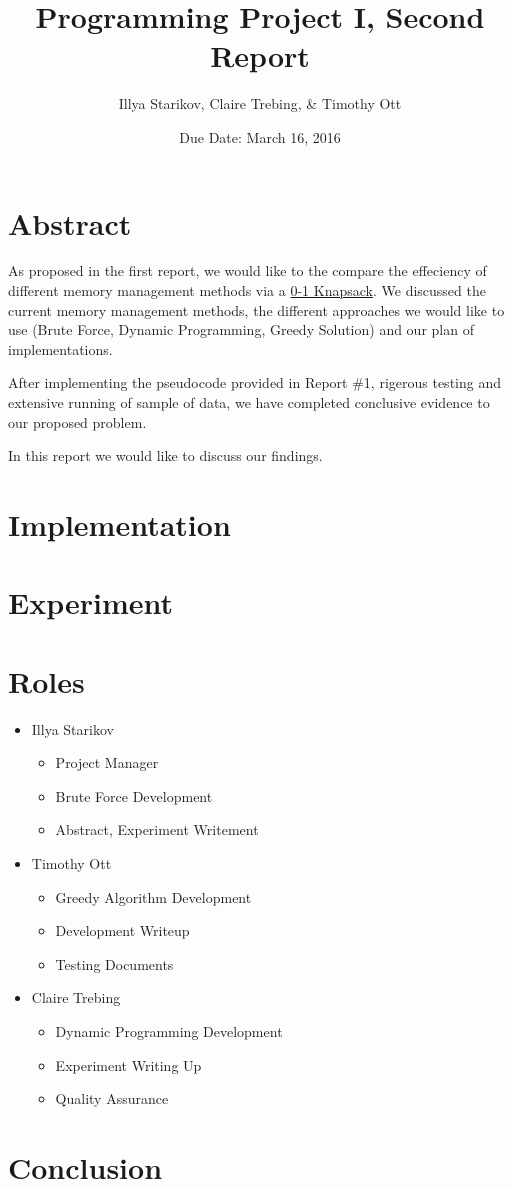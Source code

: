 \documentclass{article}
\title{Programming Project I, Second Report}
\author{Illya Starikov, Claire Trebing, \& Timothy Ott}
\date{Due Date: March 16, 2016}
\begin{document}
\maketitle

\section{Abstract}
As proposed in the first report, we would like to the compare the effeciency of different memory management methods via a \href{https://en.wikipedia.org/wiki/Knapsack_problem#0.2F1_knapsack_problem}{0-1 Knapsack}. We discussed the current memory management methods, the different approaches we would like to use (Brute Force, Dynamic Programming, Greedy Solution) and our plan of implementations.

After implementing the pseudocode provided in Report \#1, rigerous testing and extensive running of sample of data, we have completed conclusive evidence to our proposed problem.

In this report we would like to discuss our findings.

\section{Implementation}
\section{Experiment}
\section{Roles}
\begin{itemize}
    \item Illya Starikov
    \begin{itemize}
        \item Project Manager
        \item Brute Force Development
        \item Abstract, Experiment Writement
    \end{itemize}
    \item Timothy Ott
    \begin{itemize}
        \item Greedy Algorithm Development
        \item Development Writeup
        \item Testing Documents
    \end{itemize}

    \item Claire Trebing
    \begin{itemize}
        \item Dynamic Programming Development
        \item Experiment Writing Up
        \item Quality Assurance
    \end{itemize}
\end{itemize}

\section{Conclusion}
\end{document}
